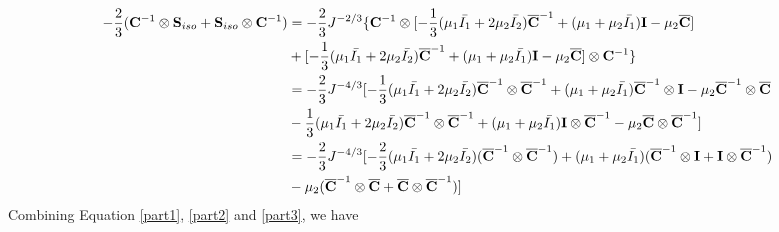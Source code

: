 \begin{equation} \label{part3}
\begin{split}
- \frac{2}{3}(\bold{C}^{-1}\otimes\bold{S}_{iso} + \bold{S}_{iso}\otimes \bold{C}^{-1})
&=
- \frac{2}{3}J^{-2/3} \{ {\bold{C}}^{-1} \otimes [-\frac{1}{3}(\mu_1\bar{I_1} + 2\mu_2\bar{I_2}){\overline{\bold{C}}}^{-1} + (\mu_1 + \mu_2\bar{I_1})\bold{I} - \mu_2{\overline{\bold{C}}}] \\
&+
[-\frac{1}{3}(\mu_1\bar{I_1} + 2\mu_2\bar{I_2}){\overline{\bold{C}}}^{-1} + (\mu_1 + \mu_2\bar{I_1})\bold{I} - \mu_2{\overline{\bold{C}}}] \otimes {\bold{C}}^{-1}\} \\
&=
- \frac{2}{3}J^{-4/3} [ -\frac{1}{3}(\mu_1\bar{I_1} + 2\mu_2\bar{I_2}) {\overline{\bold{C}}}^{-1} \otimes {\overline{\bold{C}}}^{-1} + (\mu_1 + \mu_2\bar{I_1}){\overline{\bold{C}}}^{-1}\otimes\bold{I} - \mu_2{\overline{\bold{C}}}^{-1} \otimes {\overline{\bold{C}}} \\
&-
\frac{1}{3}(\mu_1\bar{I_1} + 2\mu_2\bar{I_2}) {\overline{\bold{C}}}^{-1} \otimes {\overline{\bold{C}}}^{-1} + (\mu_1 + \mu_2\bar{I_1})\bold{I} \otimes {\overline{\bold{C}}}^{-1} - \mu_2{\overline{\bold{C}}} \otimes {\overline{\bold{C}}}^{-1}] \\
&=
 - \frac{2}{3}J^{-4/3} [ -\frac{2}{3}(\mu_1\bar{I_1} + 2\mu_2\bar{I_2})({\overline{\bold{C}}}^{-1} \otimes {\overline{\bold{C}}}^{-1}) + (\mu_1+\mu_2\bar{I_1})({\overline{\bold{C}}}^{-1} \otimes \bold{I} + \bold{I} \otimes {\overline{\bold{C}}}^{-1})\\
&- \mu_2({\overline{\bold{C}}}^{-1} \otimes {\overline{\bold{C}}}+{\overline{\bold{C}}} \otimes {\overline{\bold{C}}}^{-1}) ]
\end{split}
\end{equation}
Combining Equation \ref{part1}, \ref{part2} and \ref{part3}, we have
